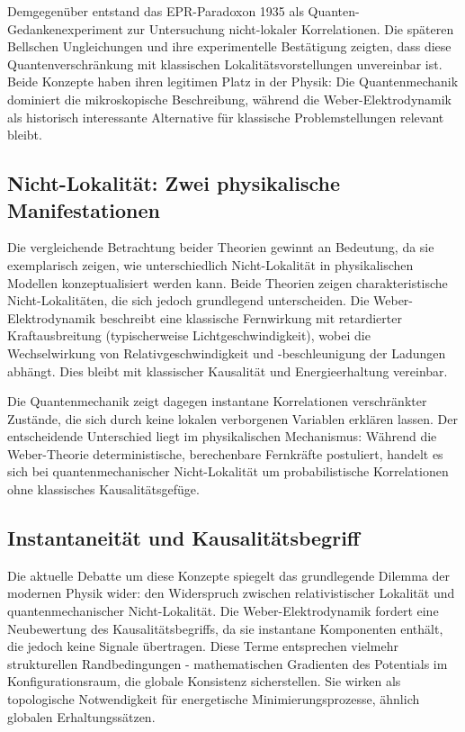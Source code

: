 Demgegenüber entstand das EPR-Paradoxon 1935 als Quanten-Gedankenexperiment zur Untersuchung nicht-lokaler Korrelationen. Die späteren Bellschen Ungleichungen und ihre experimentelle
Bestätigung zeigten, dass diese Quantenverschränkung mit klassischen Lokalitätsvorstellungen unvereinbar ist. Beide Konzepte haben ihren legitimen Platz in der Physik: Die Quantenmechanik
dominiert die mikroskopische Beschreibung, während die Weber-Elektrodynamik als historisch interessante Alternative für klassische Problemstellungen relevant bleibt.

\subsection{Nicht-Lokalität: Zwei physikalische Manifestationen}
Die vergleichende Betrachtung beider Theorien gewinnt an Bedeutung, da sie exemplarisch zeigen, wie unterschiedlich Nicht-Lokalität in physikalischen Modellen konzeptualisiert
werden kann. Beide Theorien zeigen charakteristische Nicht-Lokalitäten, die sich jedoch grundlegend unterscheiden. Die Weber-Elektrodynamik beschreibt eine klassische Fernwirkung
mit retardierter Kraftausbreitung (typischerweise Lichtgeschwindigkeit), wobei die Wechselwirkung von Relativgeschwindigkeit und -beschleunigung der Ladungen abhängt. Dies bleibt mit
klassischer Kausalität und Energieerhaltung vereinbar.

Die Quantenmechanik zeigt dagegen instantane Korrelationen verschränkter Zustände, die sich durch keine lokalen verborgenen Variablen erklären lassen. Der entscheidende Unterschied
liegt im physikalischen Mechanismus: Während die Weber-Theorie deterministische, berechenbare Fernkräfte postuliert, handelt es sich bei quantenmechanischer Nicht-Lokalität um
probabilistische Korrelationen ohne klassisches Kausalitätsgefüge.

\subsection{Instantaneität und Kausalitätsbegriff}
Die aktuelle Debatte um diese Konzepte spiegelt das grundlegende Dilemma der modernen Physik wider: den Widerspruch zwischen relativistischer Lokalität und quantenmechanischer
Nicht-Lokalität. Die Weber-Elektrodynamik fordert eine Neubewertung des Kausalitätsbegriffs, da sie instantane Komponenten enthält, die jedoch keine Signale übertragen. Diese Terme
entsprechen vielmehr strukturellen Randbedingungen - mathematischen Gradienten des Potentials im Konfigurationsraum, die globale Konsistenz sicherstellen. Sie wirken als topologische
Notwendigkeit für energetische Minimierungsprozesse, ähnlich globalen Erhaltungssätzen.

